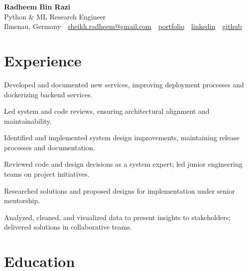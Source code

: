 \documentclass[11pt,a4paper]{resume}
\makeatletter
\newcommand{\Portfolio}{https://radheem.github.io/my-cv}
\newcommand{\PortfolioText}{portfolio}
\newcommand{\GitHub}{https://github.com/radheem}
\newcommand{\LinkedIn}{https://www.linkedin.com/in/radheem-razi}
\newcommand{\Email}{sheikh.radheem@gmail.com}
\makeatother
\begin{document}
\begin{center}
  {\huge\bfseries Radheem Bin Razi}\\[3pt]
  {\large Python \& ML Research Engineer}\\[6pt]
  \small
  Ilmenau, Germany \,\textbar\,
  \href{mailto:\Email}{\Email} \,\textbar\,
  \href{\Portfolio}{\PortfolioText} \,\textbar\,
  \href{\LinkedIn}{linkedin} \,\textbar\,
  \href{\GitHub}{github}
\end{center}
\vspace{2pt}

\section{Experience}

\bullets
  \item Developed and documented new services, improving deployment processes and dockerizing backend services.
  \item Led system and code reviews, ensuring architectural alignment and maintainability.
\bulletsend
\vspace{3pt}
\bullets
  \item Identified and implemented system design improvements, maintaining release processes and documentation.
  \item Reviewed code and design decisions as a system expert; led junior engineering teams on project initiatives.
\bulletsend
\vspace{3pt}
\bullets
  \item Researched solutions and proposed designs for implementation under senior mentorship.
  \item Analyzed, cleaned, and visualized data to present insights to stakeholders; delivered solutions in collaborative teams.
\bulletsend
\vspace{3pt}

\section{Education}

\vspace{2pt}
\end{document}

